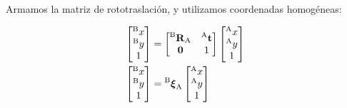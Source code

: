 \begin{frame}
Armamos la matriz de rototraslación, y utilizamos coordenadas homogéneas:

    \begin{align*}
        \begin{bmatrix}
            \toCoord{x}{B}\\
            \toCoord{y}{B}\\
            1
        \end{bmatrix} &=
        \begin{bmatrix}
            \rotationCoord{B}{A} & \toCoord{\translation}{A}\\
            \vec{0} & 1
        \end{bmatrix}
        \begin{bmatrix}
            \toCoord{x}{A}\\
            \toCoord{y}{A}\\
            1
        \end{bmatrix}\\
        \begin{bmatrix}
            \toCoord{x}{B}\\
            \toCoord{y}{B}\\
            1
        \end{bmatrix} &=
        \transform{B}{A}
        \begin{bmatrix}
            \toCoord{x}{A}\\
            \toCoord{y}{A}\\
            1
        \end{bmatrix}
    \end{align*}


\end{frame}


